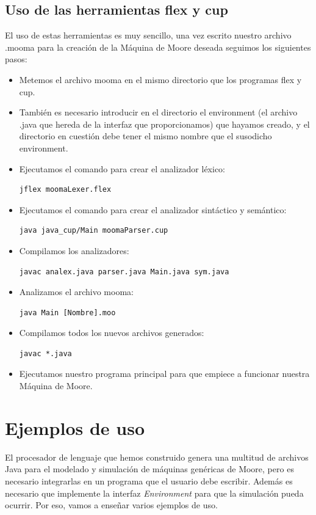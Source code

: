 \documentclass{pre-tfg}
\begin{document}
\subsection{Uso de las herramientas flex y cup}
El uso de estas herramientas es muy sencillo, una vez escrito nuestro archivo .mooma para la creación de la Máquina de Moore deseada seguimos los siguientes pasos:
\begin{itemize}
    \item Metemos el archivo mooma en el mismo directorio que los programas flex y cup.
    \item También es necesario introducir en el directorio el environment (el archivo .java que hereda de la interfaz que proporcionamos) que hayamos creado, y el directorio en cuestión debe tener el mismo nombre que el susodicho environment.
    \item Ejecutamos el comando para crear el analizador léxico: \begin{lstlisting}
jflex moomaLexer.flex
\end{lstlisting}
    \item Ejecutamos el comando para crear el analizador sintáctico y semántico:
    \begin{lstlisting}
java java_cup/Main moomaParser.cup
\end{lstlisting}
    \item Compilamos los analizadores:
    \begin{lstlisting}
javac analex.java parser.java Main.java sym.java
\end{lstlisting}
    \item Analizamos el archivo mooma:
        \begin{lstlisting}
java Main [Nombre].moo
\end{lstlisting}
    \item Compilamos todos los nuevos archivos generados:
    \begin{lstlisting}
javac *.java
\end{lstlisting}
    \item Ejecutamos nuestro programa principal para que empiece a funcionar nuestra Máquina de Moore.

\end{itemize}

\section{Ejemplos de uso}
El procesador de lenguaje que hemos construido genera una multitud de archivos Java para el modelado y simulación de máquinas genéricas de Moore, pero es necesario integrarlas en un programa que el usuario debe escribir. Además es necesario que implemente la interfaz \textit{Environment} para que la simulación pueda ocurrir. Por eso, vamos a enseñar varios ejemplos de uso.
\end{document}
